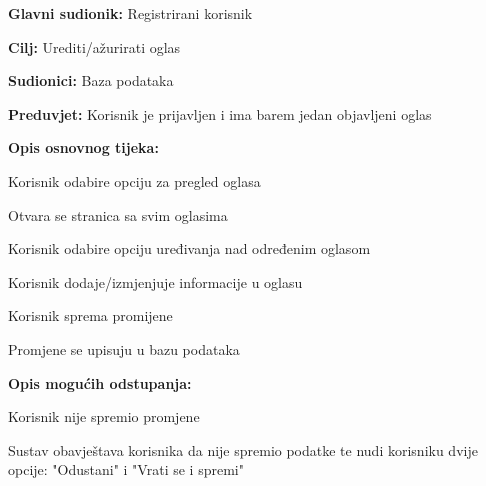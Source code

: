 				\noindent {}
					\begin{packed_item}
	
						\item \textbf{Glavni sudionik: }Registrirani korisnik
						\item  \textbf{Cilj:} Urediti/ažurirati oglas
						\item  \textbf{Sudionici:} Baza podataka
						\item  \textbf{Preduvjet:} Korisnik je prijavljen i ima barem jedan objavljeni oglas
						\item  \textbf{Opis osnovnog tijeka:}
						
						\item[] \begin{packed_enum}
	
							\item Korisnik odabire opciju za pregled oglasa
							\item Otvara se stranica sa svim oglasima
							\item Korisnik odabire opciju uređivanja nad određenim oglasom
							\item Korisnik dodaje/izmjenjuje informacije u oglasu
							\item Korisnik sprema promijene
							\item Promjene se upisuju u bazu podataka

						\end{packed_enum}		
						
						\item  \textbf{Opis mogućih odstupanja:}
						
						\item[] \begin{packed_item}
	
							\item[5.a] Korisnik nije spremio promjene
								\begin{packed_item}
									\item Sustav obavještava korisnika da nije spremio podatke te nudi korisniku dvije opcije: "Odustani" i "Vrati se i spremi"
								\end{packed_item}
								
						\end{packed_item}				
					\end{packed_item}
					
